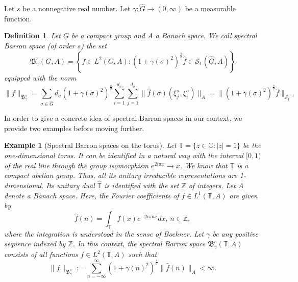 \documentclass[12pt]{amsart}%
\newtheorem{definition}[theorem]{Definition}
\newtheorem{example}[theorem]{Example}
\begin{document}
Let $s$ be a nonnegative real number. Let $\gamma : \widehat{G}\rightarrow (0,\infty)$ be a measurable function. 

\begin{definition}
Let $G$ be a compact group and $A$ a Banach space. 
 We call spectral Barron space (of order $s$) the set 
\begin{equation}
\mathfrak{B}^s_\gamma (G, A) =\left\{ f \in L^2(G,A): (1+\gamma (\sigma)^2)^{\frac{s}{2}}\widehat{f}\in \mathscr{S}_1(\widehat{G}, A)\right\}
\end{equation}
equipped with the norm
\begin{equation}
\|f\|_{\mathfrak{B}^s_\gamma}=\sum_{\sigma\in \widehat{G}}d_\sigma  (1+\gamma (\sigma)^2)^{\frac{s}{2}}\sum_{i=1}^{d_\sigma}\sum_{j=1}^{d_\sigma}\|\widehat{f}(\sigma)(\xi_j^\sigma, \xi_i^\sigma)\|_A=\|(1+\gamma (\sigma)^2)^{\frac{s}{2}}\widehat{f}\|_{\mathscr{S}_1}. 
\end{equation}
\end{definition}
 


In order to give a concrete idea of spectral Barron spaces in our context, we provide two examples before moving further.
\begin{example}[Spectral Barron spaces on the torus] {\rm 
Let $\mathbb{T}=\{z\in \mathbb{C} : |z|=1\}$ be the one-dimensional torus. It can be  identified in a natural way with the interval $[0, 1)$ of the real line through the group isomorphism $e^{2i\pi x} \rightarrow x$. We know that $\mathbb{T}$ is a compact abelian group.  Thus, all its unitary irreducible representations are  1-dimensional. Its unitary dual $\widehat{\mathbb{T}}$ is identified with the set $\mathbb{Z}$ of integers. Let $A$ denote a Banach space. 
Here, the Fourier coefficients of $f\in L^1(\mathbb{T},A)$ are given by 
\begin{equation}
\widehat{f}(n)=\int_{\mathbb{T}}f(x)e^{-2i\pi nx}dx,\, n\in \mathbb{Z},  
\end{equation}
where the integration is understood in the sense of Bochner.  
Let $\gamma$ be any positive sequence indexed by $\mathbb{Z}$. 
In this context, the spectral Barron space $\mathfrak{B}^s_\gamma (\mathbb{T}, A)$ consists of all functions $f\in L^2(\mathbb{T}, A)$ such that 
$$\|f\|_{\mathfrak{B}^s_\gamma}:=\sum\limits_{n=-\infty}^\infty (1+\gamma (n)^2)^{\frac{s}{2}}\|\widehat{f}(n)\|_A <\infty.$$
}\end{example}
\end{document}
